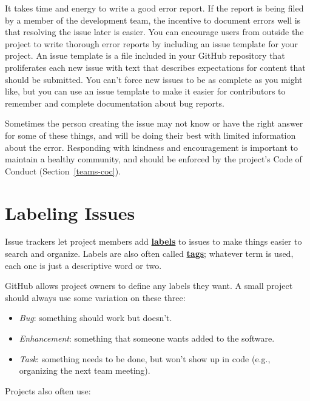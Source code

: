 \documentclass[
]{krantz}
\newcommand{\gref}[2]{\hyperlink{#2}{\textbf{#1}}}
\begin{document}
It takes time and energy to write a good error report.
If the report is being filed by a member of the development team,
the incentive to document errors well is that resolving the issue later is easier.
You can encourage users from outside the project to write thorough error reports
by including an issue template for your project.
An issue template is a file included in your GitHub repository
that proliferates each new issue with text that describes expectations
for content that should be submitted.
You can't force new issues to be as complete as you might like,
but you can use an issue template to make it easier for contributors to
remember and complete documentation about bug reports.

Sometimes the person creating the issue may not know or have the right answer for some of these things,
and will be doing their best with limited information about the error.
Responding with kindness and encouragement is important to maintain a healthy community,
and should be enforced by the project's Code of Conduct
(Section~\ref{teams-coc}).

\hypertarget{teams-labels}{%
\section{Labeling Issues}\label{teams-labels}}

Issue trackers let project members add \gref{labels}{issue\_label} to issues
to make things easier to search and organize.
Labels are also often called \gref{tags}{tag};
whatever term is used,
each one is just a descriptive word or two.

GitHub allows project owners to define any labels they want.
A small project should always use some variation on these three:

\begin{itemize}
\item
  \emph{Bug}: something should work but doesn't.
\item
  \emph{Enhancement}: something that someone wants added to the software.
\item
  \emph{Task}: something needs to be done, but won't show up in code
  (e.g., organizing the next team meeting).
\end{itemize}

Projects also often use:
\end{document}
